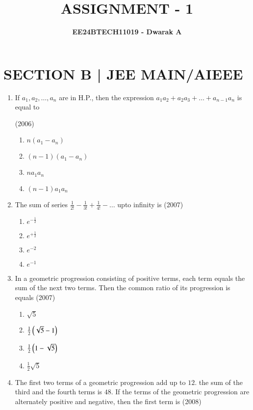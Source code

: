 \documentclass[journal,12pt,twocolumn]{IEEEtran}
\theoremstyle{remark}
\begin{document}

\vspace{3cm}

\title{\textbf{ASSIGNMENT - 1}}
\author{\textbf{EE24BTECH11019 - Dwarak A}}
\maketitle
\newpage
\bigskip

\renewcommand{\thefigure}{\theenumi}
\renewcommand{\thetable}{\theenumi}

\section*{\textbf{SECTION B | JEE MAIN/AIEEE}}
\bigskip

\begin{enumerate}
    \item If $a_1,a_2,\dots,a_n$ are in H.P., then the expression $a_1a_2+a_2a_3+\dots+a_{n-1}a_n$ is equal to
    
    \hfill(2006)

    \begin{enumerate}
    \item$n(a_1-a_n)$
    \item$(n-1)(a_1-a_n)$
    \item$na_1a_n$
    \item$(n-1)a_1a_n$ 
    \end{enumerate}
    \item The sum of series $\frac{1}{2!}-\frac{1}{3!}+\frac{1}{4!}-\dots$ upto infinity is 
    \hfill(2007)

    \begin{enumerate}
    \item$e^{-\frac{1}{2}}$
    \item$e^{+\frac{1}{2}}$
    \item$e^{-2}$
    \item$e^{-1}$
    \end{enumerate}
    \item  In a geometric progression consisting of positive terms, each term equals the sum of the next two terms. Then the common ratio of its progression is equals   
    \hfill(2007)
    
    \begin{enumerate}
    \item$\sqrt{5}$
    \item$\frac{1}{2}\left(\sqrt{5}-1\right)$
    \item$\frac{1}{2}\left(1-\sqrt{5}\right)$
    \item$\frac{1}{2}\sqrt{5}$ 
    \end{enumerate}
    \item  The first two terms of a geometric progression add up to $12$. the sum of the third and the fourth terms is $48$. If the terms of the geometric progression are alternately positive and negative, then the first term is   
    \hfill(2008)
    

\end{enumerate}
\end{document}
